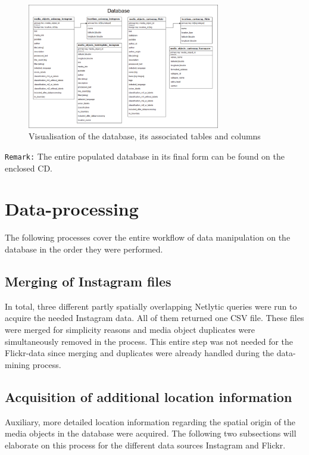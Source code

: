 \begin{figure}[h]
   \centering
   \includegraphics[width=0.75\textwidth]{img/fusion_db_overview}
   \caption{Visualisation of the database, its associated tables and columns}
   \label{fig:database}
\end{figure}

\texttt{Remark:} The entire populated database in its final form can be found on the enclosed CD.

\section{Data-processing} \label{data_processing}
The following processes cover the entire workflow of data manipulation on the database in the order they were performed.
\subsection{Merging of Instagram files} \label{netlytic_files_merge}
In total, three different partly spatially overlapping Netlytic queries were run to acquire the needed Instagram data. All of them returned one CSV file. These files were merged for simplicity reasons and media object duplicates were simultaneously removed in the process. This entire step was not needed for the Flickr-data since merging and duplicates were already handled during the data-mining process.

\subsection{Acquisition of additional location information} \label{add_location_data}
Auxiliary, more detailed location information regarding the spatial origin of the media objects in the database were acquired. The following two subsections will elaborate on this process for the different data sources Instagram and Flickr.

